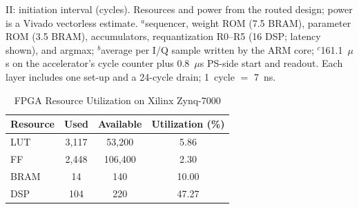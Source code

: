 \documentclass[conference]{IEEEtran}
\begin{document}
\begin{table}[t]
\vspace{2pt}
\parbox{\textwidth}{\scriptsize II: initiation interval (cycles). Resources and power from the routed design; power is a Vivado vectorless estimate. $^{a}$sequencer, weight ROM (7.5 BRAM), parameter ROM (3.5 BRAM), accumulators, requantization R0--R5 (16 DSP; latency shown), and argmax; $^{b}$average per I/Q sample written by the ARM core; $^{c}$161.1~$\mu$s on the accelerator's cycle counter plus 0.8~$\mu$s PS-side start and readout. Each layer includes one set-up and a 24-cycle drain; 1~cycle $=$ 7~ns.}
\end{table}
\begin{table}[t]
\renewcommand{\arraystretch}{1.15}
\caption{FPGA Resource Utilization on Xilinx Zynq-7000}
\label{tab:utilization}
\centering
\footnotesize
\begin{tabular}{lccc}
\toprule
\textbf{Resource} & \textbf{Used} & \textbf{Available} & \textbf{Utilization (\%)} \\
\midrule
LUT & 3,117 & 53,200 & 5.86 \\
FF & 2,448 & 106,400 & 2.30 \\
BRAM & 14 & 140 & 10.00 \\
DSP & 104 & 220 & 47.27 \\
\bottomrule
\end{tabular}
\end{table}
\end{document}
